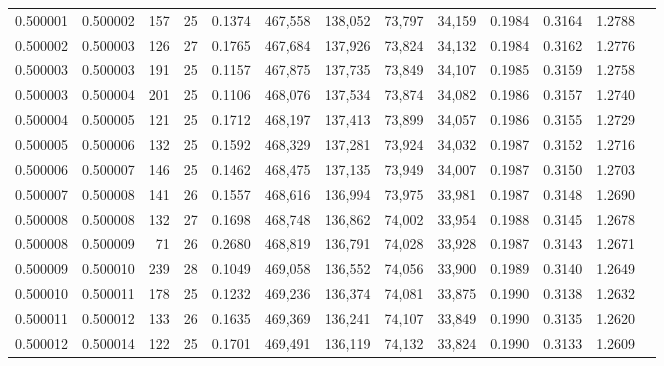 \begin{tabular}{rrrrrrrrrrrrr}
0.500001 & 0.500002 & 157 &  25 &                                     0.1374 & 467,558 & 138,052 &  73,797 &  34,159 & 0.1984 & 0.3164 & 1.2788 \\
0.500002 & 0.500003 & 126 &  27 &                                     0.1765 & 467,684 & 137,926 &  73,824 &  34,132 & 0.1984 & 0.3162 & 1.2776 \\
0.500003 & 0.500003 & 191 &  25 &                                     0.1157 & 467,875 & 137,735 &  73,849 &  34,107 & 0.1985 & 0.3159 & 1.2758 \\
0.500003 & 0.500004 & 201 &  25 &                                     0.1106 & 468,076 & 137,534 &  73,874 &  34,082 & 0.1986 & 0.3157 & 1.2740 \\
0.500004 & 0.500005 & 121 &  25 &                                     0.1712 & 468,197 & 137,413 &  73,899 &  34,057 & 0.1986 & 0.3155 & 1.2729 \\
0.500005 & 0.500006 & 132 &  25 &                                     0.1592 & 468,329 & 137,281 &  73,924 &  34,032 & 0.1987 & 0.3152 & 1.2716 \\
0.500006 & 0.500007 & 146 &  25 &                                     0.1462 & 468,475 & 137,135 &  73,949 &  34,007 & 0.1987 & 0.3150 & 1.2703 \\
0.500007 & 0.500008 & 141 &  26 &                                     0.1557 & 468,616 & 136,994 &  73,975 &  33,981 & 0.1987 & 0.3148 & 1.2690 \\
0.500008 & 0.500008 & 132 &  27 &                                     0.1698 & 468,748 & 136,862 &  74,002 &  33,954 & 0.1988 & 0.3145 & 1.2678 \\
0.500008 & 0.500009 &  71 &  26 &                                     0.2680 & 468,819 & 136,791 &  74,028 &  33,928 & 0.1987 & 0.3143 & 1.2671 \\
0.500009 & 0.500010 & 239 &  28 &                                     0.1049 & 469,058 & 136,552 &  74,056 &  33,900 & 0.1989 & 0.3140 & 1.2649 \\
0.500010 & 0.500011 & 178 &  25 &                                     0.1232 & 469,236 & 136,374 &  74,081 &  33,875 & 0.1990 & 0.3138 & 1.2632 \\
0.500011 & 0.500012 & 133 &  26 &                                     0.1635 & 469,369 & 136,241 &  74,107 &  33,849 & 0.1990 & 0.3135 & 1.2620 \\
0.500012 & 0.500014 & 122 &  25 &                                     0.1701 & 469,491 & 136,119 &  74,132 &  33,824 & 0.1990 & 0.3133 & 1.2609 \\

\end{tabular}
